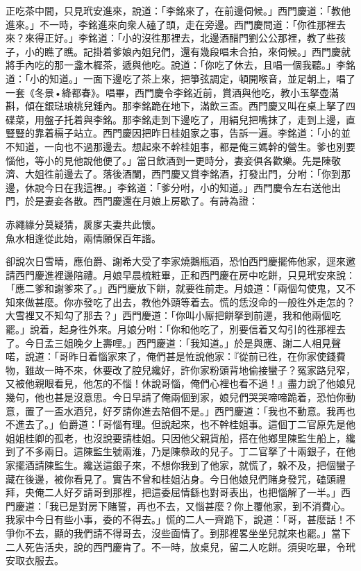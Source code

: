 正吃茶中間，只見玳安進來，說道：「李銘來了，在前邊伺候。」西門慶道：「教他進來。」不一時，李銘進來向衆人磕了頭，走在旁邊。西門慶問道：「你徃那裡去來？來得正好。」李銘道：「小的沒徃那裡去，北邊酒醋門劉公公那裡，教了些孩子，小的瞧了瞧。記掛着爹娘內姐兒們，還有幾段唱未合拍，來伺候。」西門慶就將手內吃的那一盞木樨茶，遞與他吃。說道：「你吃了休去，且唱一個我聽。」李銘道：「小的知道。」一面下邊吃了茶上來，把箏弦調定，頓開喉音，並足朝上，唱了一套《冬景•絳都春》。唱畢，西門慶令李銘近前，賞酒與他吃，教小玉拏壺滿斟，傾在銀琺琅桃兒鍾內。那李銘跪在地下，滿飲三盃。西門慶又叫在桌上拏了四碟菜，用盤子托着與李銘。那李銘走到下邊吃了，用絹兒把嘴抹了，走到上邊，直豎豎的靠着槅子站立。西門慶因把昨日桂姐家之事，告訴一遍。李銘道：「小的並不知道，一向也不過那邊去。想起來不幹桂姐事，都是俺三媽幹的營生。{}爹也別要惱他，等小的見他說他便了。」當日飲酒到一更時分，妻妾俱各歡樂。先是陳敬濟、大姐徃前邊去了。落後酒闌，西門慶又賞李銘酒，打發出門，分咐：「你到那邊，休說今日在我這裡。」李銘道：「爹分咐，小的知道。」西門慶令左右送他出門，於是妻妾各散。西門慶還在月娘上房歇了。有詩為證：

\begin{myquote} 
赤繩緣分莫疑猜，扊扅夫妻共此懷。\\魚水相逢從此始，兩情願保百年諧。
\end{myquote} 

卻說次日雪晴，應伯爵、謝希大受了李家燒鵝瓶酒，恐怕西門慶擺佈他家，逕來邀請西門慶進裡邊陪禮。月娘早晨梳粧畢，正和西門慶在房中吃餅，只見玳安來說：「應二爹和謝爹來了。」西門慶放下餅，就要徃前走。月娘道：「兩個勾使鬼，又不知來做甚麼。你亦發吃了出去，教他外頭等着去。慌的恁沒命的一般徃外走怎的？大雪裡又不知勾了那去？」西門慶道：「你叫小厮把餅拏到前邊，我和他兩個吃罷。」說着，起身徃外來。月娘分咐：「你和他吃了，別要信着又勾引的徃那裡去了。今日孟三姐晚夕上壽哩。」西門慶道：「我知道。」於是與應、謝二人相見聲喏，說道：「哥昨日着惱家來了，俺們甚是恠說他家：『從前已徃，在你家使錢費物，雖故一時不來，休要改了腔兒纔好，許你家粉頭背地偷接蠻子？冤家路兒窄，又被他親眼看見，他怎的不惱！休說哥惱，俺們心裡也看不過！』盡力說了他娘兒幾句，他也甚是沒意思。今日早請了俺兩個到家，娘兒們哭哭啼啼跪着，恐怕你動意，置了一盃水酒兒，好歹請你進去陪個不是。」{}西門慶道：「我也不動意。我再也不進去了。」伯爵道：「哥惱有理。但說起來，也不幹桂姐事。這個丁二官原先是他姐姐桂卿的孤老，也沒說要請桂姐。只因他父親貨船，搭在他鄉里陳監生船上，纔到了不多兩日。這陳監生號兩淮，乃是陳叅政的兒子。丁二官拏了十兩銀子，在他家擺酒請陳監生。纔送這銀子來，不想你我到了他家，就慌了，躲不及，把個蠻子藏在後邊，被你看見了。實告不曾和桂姐沾身。今日他娘兒們賭身發咒，磕頭禮拜，央俺二人好歹請哥到那裡，把這委屈情繇也對哥表出，也把惱解了一半。」西門慶道：「我已是對房下賭誓，再也不去，又惱甚麼？你上覆他家，到不消費心。我家中今日有些小事，委的不得去。」慌的二人一齊跪下，{}說道：「哥，甚麼話！不爭你不去，顯的我們請不得哥去，沒些面情了。到那裡畧坐坐兒就來也罷。」當下二人死告活央，說的西門慶肯了。不一時，放桌兒，留二人吃餅。須臾吃畢，令玳安取衣服去。


